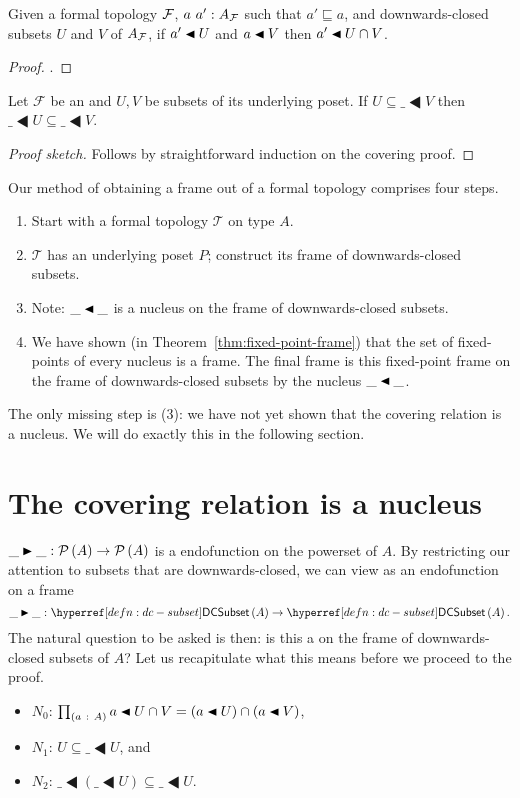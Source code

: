 \begin{prop}\label{prop:lem3}
  Given a formal topology $\mathcal{F}{}$, $a~a':A_{\mathcal{F}{}}$ such that $a' \sqsubseteq a$, and
  downwards-closed subsets $U$ and $V$ of $A_{\mathcal{F}{}}$, if $\covers{a'}{U}$ and
  $\covers{a}{V}$ then $\covers{a'}{U \cap V}$.
\end{prop}
\begin{proof}
  .
\end{proof}

\begin{prop}\label{prop:lem4}
  Let $\mathcal{F}$ be an \verintrsys{} and $U, V$ be subsets of its underlying poset. If
  $U \subseteq \_ \LHD V$ then $\_ \LHD U \subseteq \_ \LHD V$.
\end{prop}
\begin{proof}[Proof sketch]
  Follows by straightforward induction on the covering proof.
\end{proof}

Our method of obtaining a frame out of a formal topology comprises four steps.
\begin{enumerate}
  \item Start with a formal topology $\mathcal{T}$ on type $A$.
  \item $\mathcal{T}$ has an underlying poset $P$; construct its frame of downwards-closed
    subsets.
  \item Note: $\covers{\_}{\_}$ is a nucleus on the frame of downwards-closed subsets.
  \item We have shown (in Theorem~\ref{thm:fixed-point-frame}) that the set of
    fixed-points of every nucleus is a frame. The final frame is this fixed-point frame
    on the frame of downwards-closed subsets by the nucleus $\covers{\_}{\_}$.
\end{enumerate}
The only missing step is (3): we have not yet shown that the covering relation is a
nucleus. We will do exactly this in the following section.

\section{The covering relation is a nucleus}

$\_\RHD\_ : \pow{A} \rightarrow \pow{A}$ is a endofunction on the powerset of $A$. By restricting
our attention to subsets that are downwards-closed, we can view as an endofunction on a
frame
\begin{equation*}
  \oftyI{\_\RHD\_}{\dcsubset{A} \rightarrow \dcsubset{A}}.
\end{equation*}
The natural question to be asked is then: is this a \vernucleus{} on the frame of
downwards-closed subsets of $A$? Let us recapitulate what this means before we proceed
to the proof.
\begin{itemize}
  \item $N_0$: $\pity{a}{A}{a \LHD U \cap V = (a \LHD U) \cap (a \LHD V)}$,
  \item $N_1$: $U \subseteq \_ \LHD U$, and
  \item $N_2$: $\_ \LHD (\_ \LHD U) \subseteq \_ \LHD U$.
\end{itemize}

